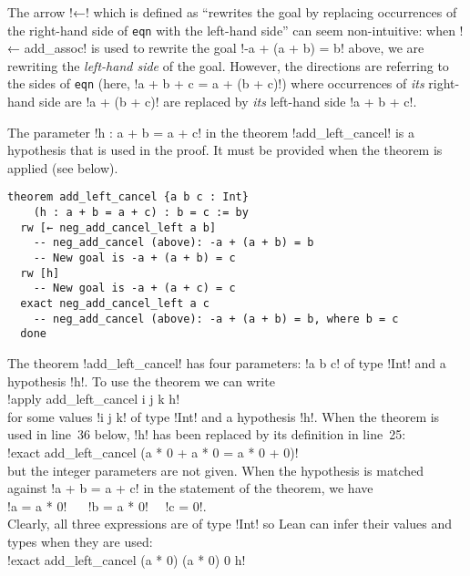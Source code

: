 The arrow !←! which is defined as ``rewrites the goal by replacing occurrences of the right-hand side of \Verb+eqn+ with the left-hand side'' can seem non-intuitive: when !← add_assoc! is used to rewrite the goal !-a + (a + b) = b! above, we are rewriting the \emph{left-hand side} of the goal. However, the directions are referring to the sides of \Verb+eqn+ (here, !a + b + c = a + (b + c)!) where occurrences of \emph{its} right-hand side are !a + (b + c)! are replaced by \emph{its} left-hand side !a + b + c!.


The parameter !h : a + b = a + c! in the theorem !add_left_cancel! is a hypothesis that is used in the proof. It must be provided when the theorem is applied (see below).
\begin{Verbatim}[firstnumber=last]
theorem add_left_cancel {a b c : Int}
    (h : a + b = a + c) : b = c := by
  rw [← neg_add_cancel_left a b]
    -- neg_add_cancel (above): -a + (a + b) = b
    -- New goal is -a + (a + b) = c
  rw [h]
    -- New goal is -a + (a + c) = c
  exact neg_add_cancel_left a c
    -- neg_add_cancel (above): -a + (a + b) = b, where b = c
  done
\end{Verbatim}

The theorem !add_left_cancel! has four parameters: !a b c! of type !Int! and a hypothesis !h!. To use the theorem we can write\\
\indnt{}!apply add_left_cancel i j k h!\\
for some values !i j k! of type !Int! and a hypothesis !h!. When the theorem is used in line~36 below, !h! has been replaced by its definition in line~25:\\
\indnt{}!exact add_left_cancel (a * 0 + a * 0 = a * 0 + 0)!\\
but the integer parameters are not given. When the hypothesis is matched against !a + b = a + c! in the statement of the theorem, we have\\
\indnt{}!a = a * 0! $\quad$ !b = a * 0!$\quad$   !c = 0!.\\
Clearly, all three expressions are of type !Int! so Lean can infer their values and types when they are used:\\
\indnt{}!exact add_left_cancel (a * 0) (a * 0) 0 h!

